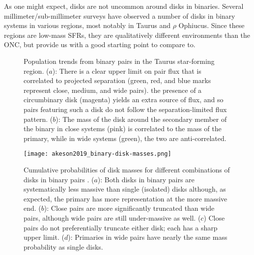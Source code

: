 As one might expect, disks are not uncommon around disks in binaries. Several millimeter/sub-millimeter surveys have observed a number of disks in binary systems in various regions, most notably in Taurus and $\rho$ Ophiucus. Since these regions are low-mass SFRs, they are qualitatively different environments than the ONC, but provide us with a good starting point to compare to.



\begin{figure}[h!]
  \caption{Population trends from binary pairs in the Taurus star-forming region. ($a$): There is a clear upper limit on pair flux that is correlated to projected separation (green, red, and blue marks represent close, medium, and wide pairs). the presence of a circumbinary disk (magenta) yields an extra source of flux, and so pairs featuring such a disk do not follow the separation-limited flux pattern. ($b$): The mass of the disk around the secondary member of the binary in close systems (pink) is correlated to the mass of the primary, while in wide systems (green), the two are anti-correlated.}
  \label{fig:taurus_binaries}
\end{figure}

\begin{figure}[h]
  \texttt{[image: akeson2019\_binary-disk-masses.png]}%
  \caption{Cumulative probabilities of disk masses for different combinations of disks in binary pairs \citep{Akeson2019}. ($a$): Both disks in binary pairs are systematically less massive than single (isolated) disks although, as expected, the primary has more representation at the more massive end. ($b$): Close pairs are more significantly truncated than wide pairs, although wide pairs are still under-massive as well. ($c$) Close pairs do not preferentially truncate either disk; each has a sharp upper limit. ($d$): Primaries in wide pairs have nearly the same mass probability as single disks.}
  \label{fig:binary-disk-masses}
\end{figure}


